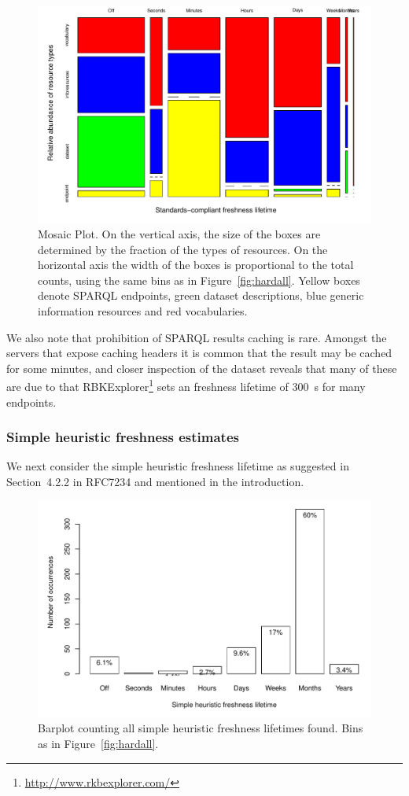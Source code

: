 \documentclass{llncs}
\begin{document}
\begin{figure}[ht]
  \centerline{%
    \includegraphics[width=.9\textwidth]{hardtable.pdf}}
  \caption{Mosaic Plot. On the vertical axis, the size of the boxes
    are determined by the fraction of the types of resources. On the
    horizontal axis the width of the boxes is proportional to the
    total counts, using the same bins as in
    Figure~\ref{fig:hardall}. Yellow boxes denote SPARQL endpoints,
    green dataset descriptions, blue generic information resources and
    red vocabularies.}
  \label{fig:hardtable}
\end{figure}


We also note that prohibition of SPARQL results caching is rare.
Amongst the servers that expose caching headers it is common
that the result may be cached for some minutes, and closer inspection
of the dataset reveals that many of these are due to that
RBKExplorer\footnote{\url{http://www.rkbexplorer.com/}} sets an
freshness lifetime of 300~s for many endpoints.

\subsubsection{Simple heuristic freshness estimates}\label{sec:simplefresh}

We next consider the simple heuristic freshness lifetime as suggested in
Section~4.2.2 in RFC7234 and mentioned in the introduction.

\begin{figure}[th!]
  \centerline{%
    \includegraphics[width=.9\textwidth]{heuristicall.pdf}}
  \caption{Barplot counting all simple heuristic freshness lifetimes
    found. Bins as in Figure~\ref{fig:hardall}.}
  \label{fig:heuristicall}
\end{figure}
\end{document}
